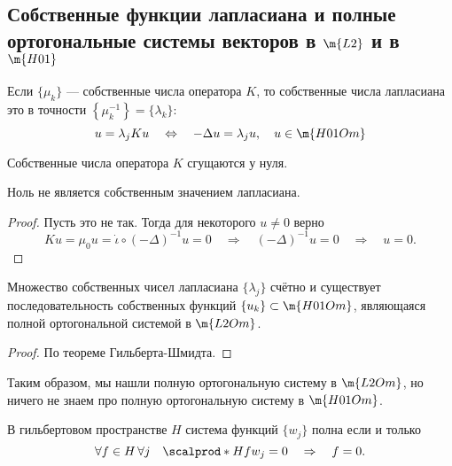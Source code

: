 \subsection{Собственные функции лапласиана и полные ортогональные системы векторов в $\m{L2}$ и в $\m{H01}$}
\begin{note}
Если $\{ \mu_k \}$ --- собственные числа оператора $K$, то собственные числа лапласиана это в точности $\left\{ \mu_k^{-1} \right\} = \{ \lambda_k \}$:
$$ u = \lambda_j K u \quad \Leftrightarrow \quad - \Delta u = \lambda_j u, \quad u \in \m{H01Om}$$
\end{note}
\begin{note}
Собственные числа оператора $K$ сгущаются у нуля.
\end{note}
\begin{note}
Ноль не является собственным значением лапласиана.
\end{note}
\begin{proof}
Пусть это не так. Тогда для некоторого $u \neq 0$ верно
$$ K u = \mu_0 u = \dot\iota \circ ( - \Delta)^{-1} u = 0 \quad \Rightarrow \quad (-\Delta)^{-1} u = 0 \quad \Rightarrow \quad u = 0.$$

\end{proof}

\begin{theorem}
Множество собственных чисел лапласиана $\{\lambda_j\}$ счётно и существует последовательность собственных функций $\{ u_k \} \subset \m{H01Om}$, являющаяся полной ортогональной системой в $\m{L2Om}$.
\end{theorem}
\begin{proof}
По теореме Гильберта-Шмидта.

\end{proof}

Таким образом, мы нашли полную ортогональную систему в $\m{L2Om}$, но ничего не знаем про полную ортогональную систему в $\m{H01Om}$.

\begin{reminder}В гильбертовом пространстве $H$ система функций $\{ w_j \}$ полна если и только
$$ \forall f \in H \, \forall j \quad \scalprod*{H}{f}{w_j} = 0 \quad \Rightarrow \quad f = 0.$$
\end{reminder}

